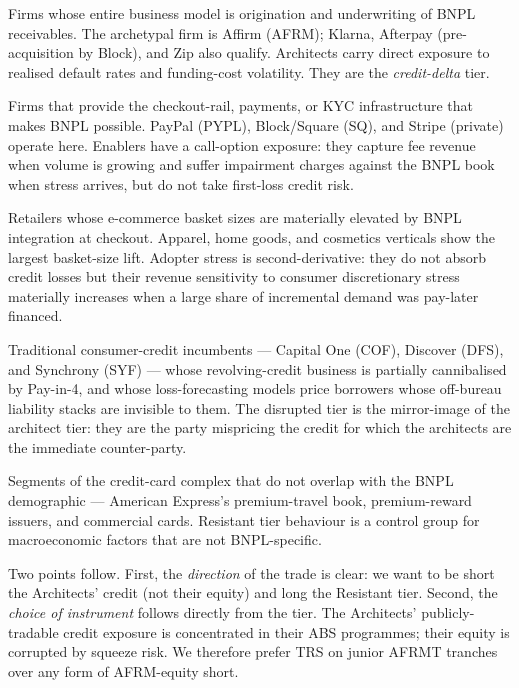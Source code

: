 \documentclass[11pt,letterpaper]{article}
\begin{document}
\begin{description}[leftmargin=2em,style=nextline]
\item[Tier 1 --- Architects.] Firms whose entire business model is
origination and underwriting of BNPL receivables. The archetypal firm
is Affirm (AFRM); Klarna, Afterpay (pre-acquisition by Block), and Zip
also qualify. Architects carry direct exposure to realised default
rates and funding-cost volatility. They are the \emph{credit-delta}
tier.
\item[Tier 2 --- Enablers.] Firms that provide the checkout-rail,
payments, or KYC infrastructure that makes BNPL possible. PayPal
(PYPL), Block/Square (SQ), and Stripe (private) operate here.
Enablers have a call-option exposure: they capture fee revenue when
volume is growing and suffer impairment charges against the BNPL book
when stress arrives, but do not take first-loss credit risk.
\item[Tier 3 --- Adopters.] Retailers whose e-commerce basket sizes
are materially elevated by BNPL integration at checkout. Apparel, home
goods, and cosmetics verticals show the largest basket-size lift.
Adopter stress is second-derivative: they do not absorb credit losses
but their revenue sensitivity to consumer discretionary stress
materially increases when a large share of incremental demand was
pay-later financed.
\item[Tier 4 --- Disrupted.] Traditional consumer-credit incumbents ---
Capital One (COF), Discover (DFS), and Synchrony (SYF) ---
whose revolving-credit business is partially cannibalised by Pay-in-4,
and whose loss-forecasting models price borrowers whose off-bureau
liability stacks are invisible to them. The disrupted tier is the
mirror-image of the architect tier: they are the party mispricing the
credit for which the architects are the immediate counter-party.
\item[Tier 5 --- Resistant.] Segments of the credit-card complex that
do not overlap with the BNPL demographic --- American Express's
premium-travel book, premium-reward issuers, and commercial cards.
Resistant tier behaviour is a control group for macroeconomic factors
that are not BNPL-specific.
\end{description}

Two points follow. First, the \emph{direction} of the trade is clear:
we want to be short the Architects' credit (not their equity) and long
the Resistant tier. Second, the \emph{choice of instrument} follows
directly from the tier. The Architects' publicly-tradable credit
exposure is concentrated in their ABS programmes; their equity is
corrupted by squeeze risk. We therefore prefer TRS on junior AFRMT
tranches over any form of AFRM-equity short.
\end{document}
